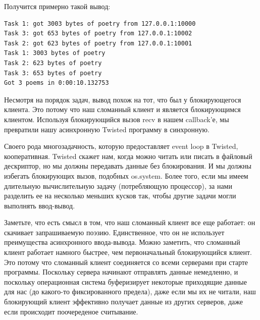 Получится примерно такой вывод:

\begin{scriptsize}\begin{verbatim}
Task 1: got 3003 bytes of poetry from 127.0.0.1:10000
Task 3: got 653 bytes of poetry from 127.0.0.1:10002
Task 2: got 623 bytes of poetry from 127.0.0.1:10001
Task 1: 3003 bytes of poetry
Task 2: 623 bytes of poetry
Task 3: 653 bytes of poetry
Got 3 poems in 0:00:10.132753
\end{verbatim}\end{scriptsize}


Несмотря на порядок задач, вывод похож на тот, что был 
у блокирующегося клиента. Это потому что наш сломанный 
клиент и является блокирующимся клиентом. Используя блокирующийся 
вызов recv в нашем callback'е, мы превратили нашу 
асинхронную Twisted программу в синхронную. 


Своего рода многозадачность, которую предоставляет 
event loop в Twisted, кооперативная. Twisted 
скажет нам, когда можно читать или писать в файловый 
дескриптор, но мы должны передавать данные без блокирования. 
И мы должны избегать блокирующих вызов, подобных os.system. 
Более того, если мы имеем длительную вычислительную 
задачу (потребляющую процессор), за нами разделить 
ее на несколько меньших кусков так, чтобы другие задачи  
могли выполнять ввод-вывод.



Заметьте, что есть смысл в том, что наш сломанный клиент 
все еще работает: он скачивает запрашиваемую поэзию. 
Единственное, что он не использует преимущества асинхронного 
ввода-вывода. Можно заметить, что сломанный клиент работает 
намного быстрее, чем первоначальный блокирующийся клиент. 
Это потому что сломанный клиент соединяется со всеми 
серверами при старте программы. Поскольку сервера начинают отправлять 
данные немедленно, и поскольку операционная система буферизирует 
некоторые приходящие данные для нас (до какого-то фиксированного предела), 
даже если мы их не читали, наш блокирующий клиент 
эффективно получает данные из других серверов, даже если 
происходит поочереденое считывание.


